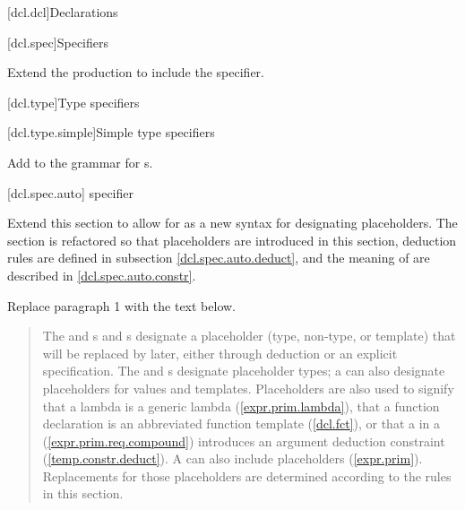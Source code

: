 
\setcounter{chapter}{6}
[dcl.dcl]{Declarations}


[dcl.spec]{Specifiers}

Extend the  production
to include the  specifier.

\begin{quote}
\begin{bnf}
\br
\end{bnf}
\end{quote}

\setcounter{subsection}{5}
[dcl.type]{Type specifiers}


\setcounter{subsubsection}{1}
[dcl.type.simple]{Simple type specifiers}
        
Add 
to the grammar for s.

\begin{quote}
\begin{bnf}
\br
\end{bnf}
\end{quote}


\setcounter{subsubsection}{3}
[dcl.spec.auto]{ specifier}

Extend this section to allow for 
as a new syntax for designating placeholders. The section is refactored so
that placeholders are introduced in this section, deduction rules are
defined in subsection \ref{dcl.spec.auto.deduct}, and the meaning of
 are described in
\ref{dcl.spec.auto.constr}.

Replace paragraph 1 with the text below.

\begin{quote}
\pnum
The  and  s and
s designate a placeholder
(type, non-type, or template) that will be replaced by later, either through 
deduction or an explicit specification.
%
The  and  s 
designate placeholder types; a  can 
also designate placeholders for values and templates. 
%
Placeholders are also used to signify that a lambda is a generic lambda 
(\ref{expr.prim.lambda}), that a function declaration is an
abbreviated function template (\ref{dcl.fct}), or that a 
 in a 
(\ref{expr.prim.req.compound}) introduces an argument deduction constraint 
(\ref{temp.constr.deduct}).
%
\enternote
A  can also include placeholders (\ref{expr.prim}).
Replacements for those placeholders are determined according to the rules
in this section.
\exitnote
% 
\end{quote}

